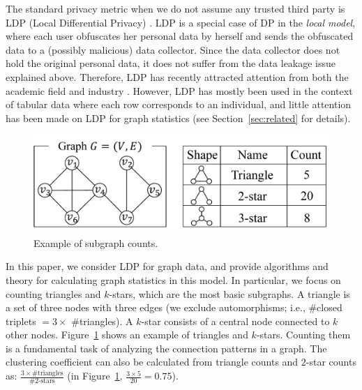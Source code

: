 The standard privacy metric when we do not assume any trusted third party is LDP (Local Differential Privacy) \cite{Duchi_FOCS13,Kasiviswanathan_FOCS08}. 
LDP is a special case of DP in the \textit{local model}, where each user obfuscates her personal data by herself and sends the obfuscated data to a (possibly malicious) data collector. 
Since the data collector does not hold the original personal data, it does not suffer from the data leakage issue explained above. 
Therefore, LDP has recently attracted attention from both the academic field \cite{Acharya_AISTATS19,Bassily_STOC15,Bassily_NIPS17,Fanti_PoPETs16,Kairouz_ICML16,Kairouz_JMLR16,Murakami_USENIX19,Qin_CCS16,Wang_USENIX17,Ye_ISIT17} and industry \cite{Erlingsson_CCS14,Ding_NIPS17,Thakurta_USPatent17}. 
However, LDP has mostly been used in the context of tabular data where each row corresponds to an individual, and little attention has been made on LDP for graph statistics (see 
Section~\ref{sec:related} for details). 

\begin{figure}
\centering
\includegraphics[width=0.9\linewidth]{fig/subgraph.pdf}
\vspace{-2mm}
\caption{Example of subgraph counts.}
\label{fig:subgraph}
\end{figure}

In this paper, we consider LDP for graph data, and 
provide algorithms and theory 
for calculating graph statistics in this model. 
In particular, we focus on counting triangles and $k$-stars, which are the most basic subgraphs. 
A triangle is a set of three nodes with three edges (we exclude automorphisms; i.e., \#closed triplets $= 3 \times$ \#triangles). 
A $k$-star consists of a central node connected to $k$ other nodes. 
Figure~\ref{fig:subgraph} shows an example of triangles and $k$-stars. 
Counting them is a fundamental task of analyzing the connection patterns in a graph. 
The clustering coefficient can also be calculated from triangle counts and $2$-star counts as: $\frac{3 \times \text{\#triangles}}{\#2\text{-stars}}$ (in Figure~\ref{fig:subgraph}, $\frac{3 \times 5}{20} = 0.75$). 

